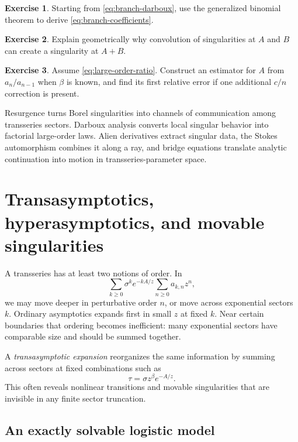\documentclass[11pt,openany]{book}
\theoremstyle{definition}
\newtheorem{exercise}{Exercise}[chapter]
\theoremstyle{plain}
\theoremstyle{remark}
\begin{document}
\begin{exercise}
Starting from \eqref{eq:branch-darboux}, use the generalized binomial theorem to derive \eqref{eq:branch-coefficients}.
\end{exercise}

\begin{exercise}
Explain geometrically why convolution of singularities at $A$ and $B$ can create a singularity at $A+B$.
\end{exercise}

\begin{exercise}
Assume \eqref{eq:large-order-ratio}. Construct an estimator for $A$ from $a_n/a_{n-1}$ when $\beta$ is known, and find its first relative error if one additional $c/n$ correction is present.
\end{exercise}

\begin{summarybox}
Resurgence turns Borel singularities into channels of communication among transseries sectors. Darboux analysis converts local singular behavior into factorial large-order laws. Alien derivatives extract singular data, the Stokes automorphism combines it along a ray, and bridge equations translate analytic continuation into motion in transseries-parameter space.
\end{summarybox}


\chapter{Transasymptotics, hyperasymptotics, and movable singularities}\label{ch:transasymptotics}

A transseries has at least two notions of order. In
\[
 \sum_{k\ge0}\sigma^ke^{-kA/z}\sum_{n\ge0}a_{k,n}z^n,
\]
we may move deeper in perturbative order $n$, or move across exponential sectors $k$. Ordinary asymptotics expands first in small $z$ at fixed $k$. Near certain boundaries that ordering becomes inefficient: many exponential sectors have comparable size and should be summed together.

A \emph{transasymptotic expansion} reorganizes the same information by summing across sectors at fixed combinations such as
\begin{equation}\label{eq:transasymptotic-variable}
 \tau=\sigma z^\beta e^{-A/z}.
\end{equation}
This often reveals nonlinear transitions and movable singularities that are invisible in any finite sector truncation.

\section{An exactly solvable logistic model}
\end{document}

